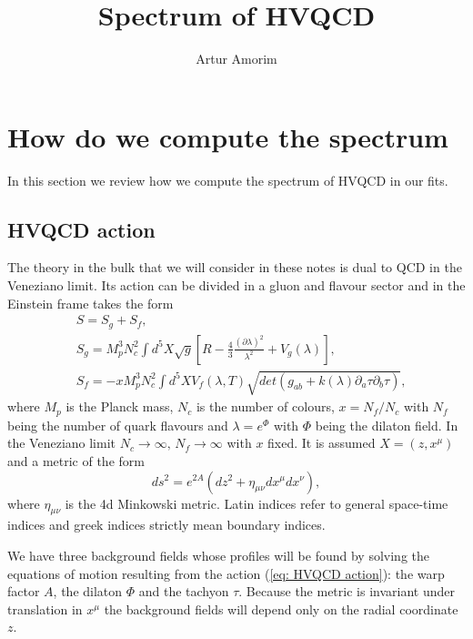 \documentclass[10 pt]{article}
\title{Spectrum of HVQCD}
\author{Artur Amorim }
\date{}
\begin{document}
\maketitle

\section{How do we compute the spectrum}

In this section we review how we compute the spectrum of HVQCD in our fits.

\subsection{HVQCD action}

The theory in the bulk that we will consider in these notes is dual to QCD in the Veneziano limit. Its action can be divided in a gluon and flavour sector and in the Einstein frame takes the form
\begin{align}
&S = S_g + S_f, \\
&S_g =  M_p^3 N_c^2 \int d^5X \sqrt{g} \left[ R - \frac{4}{3} \frac{{\left( \partial \lambda \right)}^2}{\lambda^2}+ V_g \left( \lambda\right) \right], \\
&S_f = - x M_p^3 N_c^2 \int d^5 X V_f\left(\lambda, T\right) \sqrt{det\left(g_{ab} + k\left(\lambda\right) \partial_a \tau \partial_b \tau \right)},
\label{eq: HVQCD action}
\end{align}
where $M_p$ is the Planck mass, $N_c$ is the number of colours, $x = N_f / N_c$ with $N_f$ being the number of quark flavours and $\lambda = e^{\Phi}$ with $\Phi$ being the dilaton field. In the Veneziano limit $N_c \to \infty, \, N_f \to \infty$ with $x$ fixed. It is assumed $X = \left(z, x^\mu \right)$ and a metric of the form
\begin{equation}
\label{eq: metric definition}
ds^2 = e^{2 A} \left( d z^2 + \eta_{\mu \nu} dx^\mu dx^\nu \right),
\end{equation}
where $\eta_{\mu\nu}$ is the 4d Minkowski metric. Latin indices refer to general space-time indices and greek indices strictly mean boundary indices.

We have three background fields whose profiles will be found by solving the equations of motion resulting from the action (\ref{eq: HVQCD action}): the warp factor $A$, the dilaton $\Phi$ and the tachyon $\tau$. Because the metric is invariant under translation in $x^\mu$ the background fields will depend only on the radial coordinate $z$.
\end{document}
